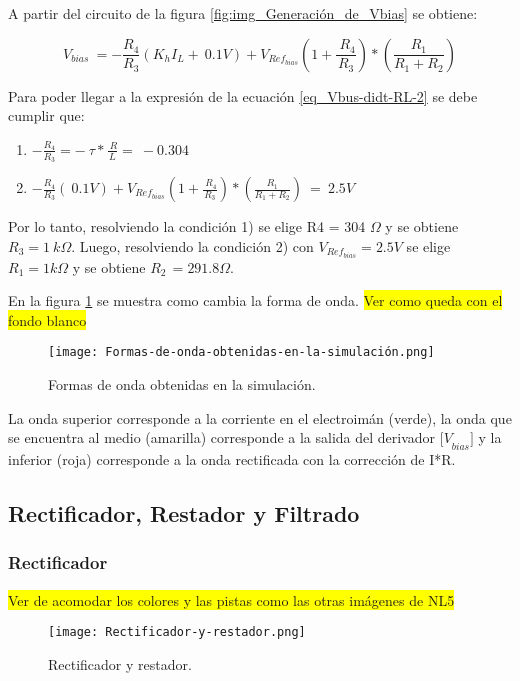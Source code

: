 \noindent A partir del circuito de la figura \ref{fig:img_Generación_de_Vbias} se obtiene:

\begin{equation} \label{eq_Vyf-Vbias3}
	V_{bias}\ =-\frac{R_4}{R_3}(K_hI_L+\ 0.1V)+V_{Ref_{bias}}(1+\frac{\ R_4}{R_3})*(\frac{R_1}{R_1+R_2})
\end{equation}

\noindent Para poder llegar a la expresi\'{o}n de la ecuaci\'{o}n \ref{eq_Vbus-didt-RL-2} se debe cumplir que:

\begin{enumerate}
	\item  $-\frac{R_4}{R_3}=-\ \tau *\frac{\ R}{L}=\ -0.304$  
	
	\item  $-\frac{R_4}{R_3}(\ 0.1V)+V_{Ref_{bias}}(1+\frac{\ R_4}{R_3})*(\frac{R_1}{R_1+R_2})\ =\ 2.5V$     
\end{enumerate}

\noindent Por lo tanto, resolviendo la condici\'{o}n 1) se elige R4 = 304 $\mathit{\Omega}$ y se obtiene $R_3=1\ k\mathit{\Omega}$. Luego, resolviendo la condici\'{o}n 2) con $V_{Ref_{bias}}=2.5V$ se elige $R_1=1k\mathit{\Omega}$ y se obtiene $R_{2\ }=291.8\mathit{\Omega}.$

\noindent En la figura \ref{fig:img_Formas_de_onda_obtenidas_en_la_simulación} se muestra como cambia la forma de onda.
\colorbox{yellow}{Ver como queda con el fondo blanco}
\begin{figure}[H]
	\centering
	\texttt{[image: Formas-de-onda-obtenidas-en-la-simulación.png]}
	\caption{Formas de onda obtenidas en la simulación.}
	\label{fig:img_Formas_de_onda_obtenidas_en_la_simulación}
\end{figure}

\noindent La onda superior corresponde a la corriente en el electroim\'{a}n (verde), la onda que se encuentra al medio (amarilla) corresponde a la salida del derivador ${[V}_{bias}$$]$ y la inferior (roja) corresponde a la onda rectificada con la correcci\'{o}n de I*R.

\subsection{Rectificador, Restador y Filtrado}

\subsubsection{Rectificador}
\colorbox{yellow}{Ver de acomodar los colores y las pistas como las otras imágenes de NL5}
\begin{figure}[H]
	\centering
	\texttt{[image: Rectificador-y-restador.png]}
	\caption{Rectificador y restador.}
	\label{fig:img_Rectificador_y_restador}
\end{figure}

